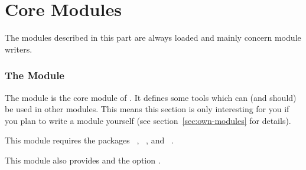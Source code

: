 \documentclass{chemmacros-manual}
\begin{document}
\part{Core Modules}

The modules described in this part are always loaded and mainly concern module
writers.

\section{The  Module}\label{sec:base-module}

The  module is the core module of \chemmacros. It defines
some tools which can (and should) be used in other modules.  This means this
section is only interesting for you if you plan to write a module yourself
(see section~\vref{sec:own-modules} for details).

This module requires the packages ~\cite{pkg:bm}, 
~\cite{pkg:amstext}, and ~\cite{pkg:etoolbox}.

This module also provides  and the option .
\end{document}
